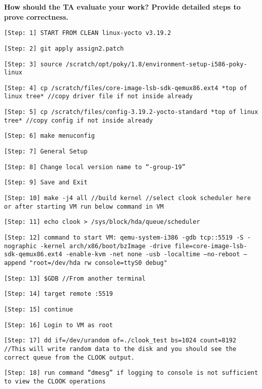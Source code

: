 \documentclass[10pt,letterpaper,draftclsnofoot,onecolumn]{IEEEtran}
\begin{document}
\noindent\textbf{How should the TA evaluate your work? Provide detailed steps to prove correctness.}
\begin{description}
\item \texttt{[Step: 1] START FROM CLEAN linux-yocto v3.19.2}
\item \texttt{[Step: 2] git apply assign2.patch}
\item \texttt{[Step: 3] source /scratch/opt/poky/1.8/environment-setup-i586-poky-linux}
\item \texttt{[Step: 4] cp /scratch/files/core-image-lsb-sdk-qemux86.ext4 *top of linux tree* \newline //copy driver file if not inside already}
\item \texttt{[Step: 5] cp /scratch/files/config-3.19.2-yocto-standard *top of linux tree* \newline//copy config if not inside already}
\item \texttt{[Step: 6] make menuconfig}
\item \texttt{[Step: 7] General Setup}
\item \texttt{[Step: 8] Change local version name to “-group-19”}
\item \texttt{[Step: 9] Save and Exit}
\item \texttt{[Step: 10] make -j4 all \newline //build kernel \newline //select clook scheduler here or after starting VM run below command in VM}
\item \texttt{[Step: 11] echo clook > /sys/block/hda/queue/scheduler}
\item \texttt{[Step: 12] command to start VM: \newline qemu-system-i386 -gdb tcp::5519 -S -nographic -kernel arch/x86/boot/bzImage -drive file=core-image-lsb-sdk-qemux86.ext4 -enable-kvm -net none -usb -localtime --no-reboot --append "root=/dev/hda rw console=ttyS0 debug"}
\item \texttt{[Step: 13] \$GDB \newline //From another terminal}
\item \texttt{[Step: 14] target remote :5519}
\item \texttt{[Step: 15] continue}
\item \texttt{[Step: 16] Login to VM as root}
\item \texttt{[Step: 17] dd if=/dev/urandom of=./clook\_test bs=1024 count=8192 \newline //This will write random data to the disk and you should see the correct queue from the CLOOK output.} 
\item \texttt{[Step: 18] run command “dmesg” if logging to console is not sufficient to view the CLOOK operations}

\end{description}



\end{document}
